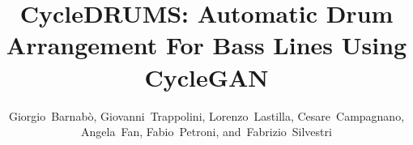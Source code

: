 \documentclass[journal]{IEEEtran}
\begin{document}
%
\title{CycleDRUMS: Automatic Drum Arrangement For Bass Lines Using CycleGAN}
%
%
%

\author{Giorgio~Barnabò,
        Giovanni~Trappolini,
        Lorenzo~Lastilla,
        Cesare~Campagnano,
        Angela~Fan,
        Fabio~Petroni,
        and~Fabrizio~Silvestri}



% 
%
\end{document}
